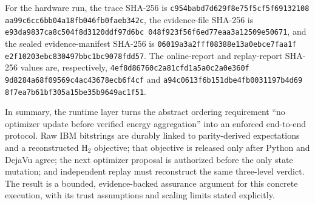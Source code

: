 For the hardware run, the trace SHA-256 is
\texttt{c954babd7d629f8e\allowbreak{}75f5cf5f69132108\allowbreak{}
aa99c6cc6bb04a18\allowbreak{}fb046fb0faeb342c},
the evidence-file SHA-256 is
\texttt{e93da9837ca8c504\allowbreak{}f8d3120ddf97d6bc\allowbreak{}
048f923f56f6ed77\allowbreak{}eaa3a12509e50671},
and the sealed evidence-manifest SHA-256 is
\texttt{06019a3a2fff0838\allowbreak{}8e13a0ebce7faa1f\allowbreak{}
e2f10203ebc83049\allowbreak{}7bbc1bc9078fdd57}.
The online-report and replay-report SHA-256 values are, respectively,
\texttt{4ef8d86760c2a81c\allowbreak{}fd1a5a0c2a0e360f\allowbreak{}
9d8284a68f09569c\allowbreak{}4ac43678ecb6f4cf}
and
\texttt{a94c0613f6b151db\allowbreak{}e4fb0031197b4d69\allowbreak{}
8f7ea7b61bf305a1\allowbreak{}5be35b9649ac1f51}.

In summary, the runtime layer turns the abstract ordering requirement
``no optimizer update before verified energy aggregation'' into an enforced
end-to-end protocol.  Raw IBM bitstrings are durably linked to parity-derived
expectations and a reconstructed H$_2$ objective; that objective is released
only after Python and DejaVu agree; the next optimizer proposal is authorized
before the only state mutation; and independent replay must reconstruct the
same three-level verdict.  The result is a bounded, evidence-backed assurance
argument for this concrete execution, with its trust assumptions and scaling
limits stated explicitly.

